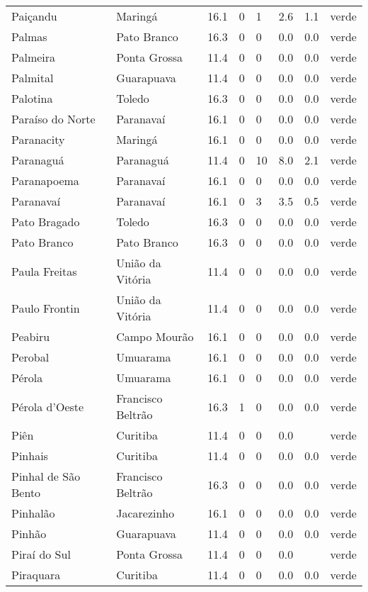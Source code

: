 \begin{longtable}{l|lllllll}
  Paiçandu & Maringá & 16.1 & 0 & 1 & 2.6 & 1.1 & verde \\ 
  Palmas & Pato Branco & 16.3 & 0 & 0 & 0.0 & 0.0 & verde \\ 
  Palmeira & Ponta Grossa & 11.4 & 0 & 0 & 0.0 & 0.0 & verde \\ 
  Palmital & Guarapuava & 11.4 & 0 & 0 & 0.0 & 0.0 & verde \\ 
  Palotina & Toledo & 16.3 & 0 & 0 & 0.0 & 0.0 & verde \\ 
  Paraíso do Norte & Paranavaí & 16.1 & 0 & 0 & 0.0 & 0.0 & verde \\ 
  Paranacity & Maringá & 16.1 & 0 & 0 & 0.0 & 0.0 & verde \\ 
  Paranaguá & Paranaguá & 11.4 & 0 & 10 & 8.0 & 2.1 & verde \\ 
  Paranapoema & Paranavaí & 16.1 & 0 & 0 & 0.0 & 0.0 & verde \\ 
  Paranavaí & Paranavaí & 16.1 & 0 & 3 & 3.5 & 0.5 & verde \\ 
  Pato Bragado & Toledo & 16.3 & 0 & 0 & 0.0 & 0.0 & verde \\ 
  Pato Branco & Pato Branco & 16.3 & 0 & 0 & 0.0 & 0.0 & verde \\ 
  Paula Freitas & União da Vitória & 11.4 & 0 & 0 & 0.0 & 0.0 & verde \\ 
  Paulo Frontin & União da Vitória & 11.4 & 0 & 0 & 0.0 & 0.0 & verde \\ 
  Peabiru & Campo Mourão & 16.1 & 0 & 0 & 0.0 & 0.0 & verde \\ 
  Perobal & Umuarama & 16.1 & 0 & 0 & 0.0 & 0.0 & verde \\ 
  Pérola & Umuarama & 16.1 & 0 & 0 & 0.0 & 0.0 & verde \\ 
  Pérola d'Oeste & Francisco Beltrão & 16.3 & 1 & 0 & 0.0 & 0.0 & verde \\ 
  Piên & Curitiba & 11.4 & 0 & 0 & 0.0 &  & verde \\ 
  Pinhais & Curitiba & 11.4 & 0 & 0 & 0.0 & 0.0 & verde \\ 
  Pinhal de São Bento & Francisco Beltrão & 16.3 & 0 & 0 & 0.0 & 0.0 & verde \\ 
  Pinhalão & Jacarezinho & 16.1 & 0 & 0 & 0.0 & 0.0 & verde \\ 
  Pinhão & Guarapuava & 11.4 & 0 & 0 & 0.0 & 0.0 & verde \\ 
  Piraí do Sul & Ponta Grossa & 11.4 & 0 & 0 & 0.0 &  & verde \\ 
  Piraquara & Curitiba & 11.4 & 0 & 0 & 0.0 & 0.0 & verde \\ 

\end{longtable}
